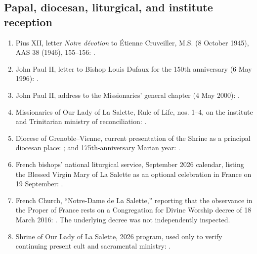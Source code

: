 \subsection{Papal, diocesan, liturgical, and institute reception}

\begin{enumerate}
  \item Pius XII, letter \emph{Notre dévotion} to Étienne Cruveiller, M.S. (8 October 1945), AAS 38 (1946), 155--156: .
  \item John Paul II, letter to Bishop Louis Dufaux for the 150th anniversary (6 May 1996): .
  \item John Paul II, address to the Missionaries' general chapter (4 May 2000): .
  \item Missionaries of Our Lady of La Salette, Rule of Life, nos. 1--4, on the institute and Trinitarian ministry of reconciliation: .
  \item Diocese of Grenoble--Vienne, current presentation of the Shrine as a principal diocesan place: ; and 175th-anniversary Marian year: .
  \item French bishops' national liturgical service, September 2026 calendar, listing the Blessed Virgin Mary of La Salette as an optional celebration in France on 19 September: .
  \item French Church, ``Notre-Dame de La Salette,'' reporting that the observance in the Proper of France rests on a Congregation for Divine Worship decree of 18 March 2016: . The underlying decree was not independently inspected.
  \item Shrine of Our Lady of La Salette, 2026 program, used only to verify continuing present cult and sacramental ministry: .
\end{enumerate}

